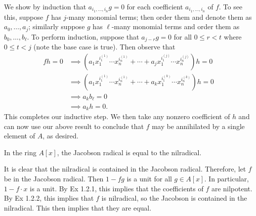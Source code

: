 \documentclass[10pt]{amsart}
\begin{document}
\begin{solution}
\begin{itemize}
        We show by induction that $a_{i_1, \dots, i_n}g = 0$ for each coefficient $a_{i_1, \dots, i_n}$ 
        of $f$. To see this, suppose $f$ has $j$-many monomial terms; then order them and denote them 
        as $a_0, \dots, a_j$; similarly suppose $g$ has $\ell$-many monomial terms and order them as $b_0, \dots, b_{\ell}$. 
        To perform induction, suppose that $a_{j - r}g = 0$ for all $0 \le r < t$ where $0 \le t < j$ (note the base case is true).
        Then observe that 
        \begin{align*}
            fh = 0 
            &\implies (a_1x_1^{i^{(1)}_1} \cdots x_n^{i^{(1)}_n} + \cdots + a_jx_1^{i^{(j)}_1} \cdots x_n^{i^{(j)}_n})h = 0 \\
            &\implies (a_1x_1^{i^{(1)}_1} \cdots x_n^{i^{(1)}_n} + \cdots + a_kx_1^{i^{(k)}_1} \cdots x_n^{i^{(k)}_n})h = 0 \\
            &\implies a_kb_{\ell} = 0 \\
            &\implies a_kh = 0.
        \end{align*}
        This completes our inductive step. We then take any nonzero coefficient of $h$ and can now use 
        our above result to conclude that $f$ may be annihilated by a single element of $A$, as desired. 

        





    \end{itemize}
\end{solution}

\begin{exercise}
    In the ring $A[x]$, the Jacobson radical is equal to the nilradical.
\end{exercise}

\begin{solution}
    It is clear that the nilradical is contained in the Jacobson radical. 
    Therefore, let $f$ be in the Jacobson radical. Then $1 - fg$ is a unit for 
    all $g \in A[x]$. In particular, $1 - f\cdot x$ is a unit. By Ex 1.2.1, 
    this implies that the coefficients of $f$ are nilpotent. By Ex 1.2.2, 
    this implies that $f$ is nilradical, so the Jacobson is contained in the nilradical. 
    This then implies that they are equal.
\end{solution}
\end{document}
